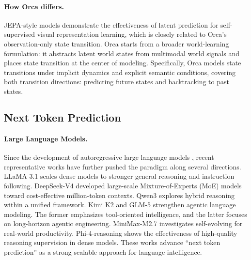 \vspace{-0.5em}
\paragraph{How Orca differs.}
JEPA-style models demonstrate the effectiveness of latent prediction for self-supervised visual representation learning, which is closely related to Orca's observation-only state transition.
Orca starts from a broader world-learning formulation: it abstracts latent world states from multimodal world signals and places state transition at the center of modeling.
Specifically, Orca models state transitions under implicit dynamics and explicit semantic conditions, covering both transition directions: predicting future states and backtracking to past states.

\vspace{-1em}
\subsection{Next Token Prediction}\label{sec:ntp}
\paragraph{Large Language Models.}\label{sec:llms}
Since the development of autoregressive large language models \citep{DeepSeek-R1, Llama-2}, recent representative works have further pushed the paradigm along several directions. 
LLaMA 3.1 \citep{llama3.1} scales dense models to stronger general reasoning and instruction following. DeepSeek-V4 \citep{DeepSeek-V4} developed large-scale Mixture-of-Experts (MoE) models toward cost-effective million-token contexts. Qwen3 \citep{Qwen3} explores hybrid reasoning within a unified framework. Kimi K2 \citep{Kimi-K2} and GLM-5 \citep{GLM-5} strengthen agentic language modeling. The former emphasizes tool-oriented intelligence, and the latter focuses on long-horizon agentic engineering. MiniMax-M2.7 \citep{MiniMax-M2.7} investigates self-evolving for real-world productivity. Phi-4-reasoning \citep{Phi-4-reasoning} shows the effectiveness of high-quality reasoning supervision in dense models. These works advance ``next token prediction'' as a strong scalable approach for language intelligence.


\vspace{-0.5em}
